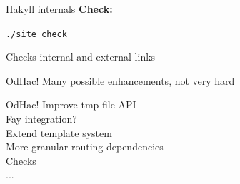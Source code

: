 \documentclass[20pt]{beamer}
\newcommand{\vspaced}{
    \vspace{5mm}
}
\begin{document}
\begin{frame}{Hakyll internals}
    \textbf{Check:} \\
    \vspaced
    \texttt{./site check} \\
    \vspaced
    Checks internal and external links
\end{frame}


\begin{frame}{OdHac!}
    Many possible enhancements, not very hard
\end{frame}

\begin{frame}{OdHac!}
    Improve tmp file API \\
    Fay integration? \\
    Extend template system \\
    More granular routing dependencies \\
    Checks \\
    ... \\
\end{frame}


\begin{frame}[plain]
\end{frame}
\end{document}
